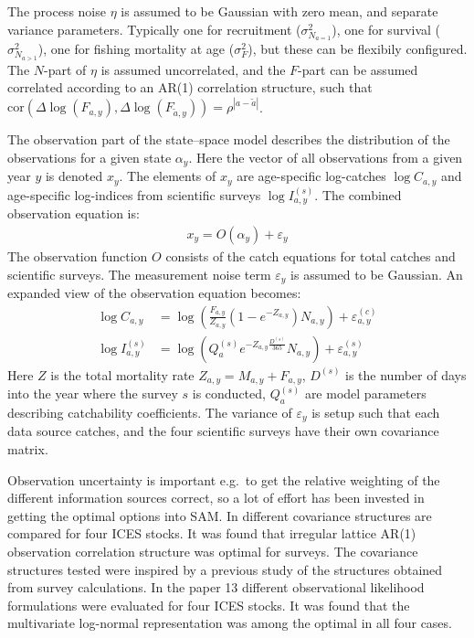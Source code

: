 \documentclass[12pt,letterpaper, leqno]{article}
\begin{document}
The process noise $\eta$ is assumed to be Gaussian with zero mean, and separate variance parameters. Typically one for recruitment ($\sigma^2_{N_{a=1}}$), one for survival ($\sigma^2_{N_{a>1}}$), one for fishing mortality at age ($\sigma^2_{F}$), but these can be flexibily configured. The $N$-part of $\eta$ is assumed uncorrelated, and the $F$-part can be assumed correlated according to an AR(1) correlation structure, such that $\mbox{cor}(\Delta\log(F_{a,y}),\Delta\log(F_{\tilde{a},y}))=\rho^{|a-\tilde{a}|}$. 

The observation part of the state--space model describes the distribution of the observations for a given state $\alpha_y$. Here the vector of all observations from a given year $y$ is denoted $x_y$. The elements of $x_y$ are age-specific log-catches $\log C_{a,y}$ and age-specific log-indices from scientific surveys $\log I^{(s)}_{a,y}$.  The combined observation equation is:
 \begin{align*}
 x_y=O(\alpha_y)+\varepsilon_y
 \end{align*}
 The observation function $O$ consists of the catch equations for total catches and scientific surveys. The measurement noise term $\varepsilon_y$ is assumed to be Gaussian. An expanded view of the observation equation becomes:
 \begin{align*}
 \log C_{a,y} &= 
\log\left(\frac{F_{a,y}}{Z_{a,y}}(1-e^{-Z_{a,y}})N_{a,y}\right)+\varepsilon^{(c)}_{a,y}\\
 \log I^{(s)}_{a,y} &= 
 \log\left(Q^{(s)}_a e^{-Z_{a,y}\frac{D^{(s)}}{365}}N_{a,y}\right)+\varepsilon^{(s)}_{a,y}
\end{align*}   
Here $Z$ is the total mortality rate $Z_{a,y}=M_{a,y}+F_{a,y}$, $D^{(s)}$ is the number of days into the year where the survey $s$ is conducted, $Q^{(s)}_a$ are model parameters describing catchability coefficients. The variance of $\varepsilon_y$ is setup such that each data source catches, and the four scientific surveys have their own covariance matrix. 

Observation uncertainty is important e.g.~to get the relative weighting of the different information sources correct, so a lot of effort has been invested in getting the optimal options into SAM. In \citet{berg2016accounting} different covariance structures are compared for four ICES stocks. It was found that irregular lattice AR(1) observation correlation structure was optimal for surveys. The covariance structures tested were inspired by a previous study \citep{berg2014evaluation} of the structures obtained from survey calculations. In the paper \citet{albertsen2016choosing} 13 different observational likelihood formulations were evaluated for four ICES stocks. It was found that the multivariate log-normal representation was among the optimal in all four cases.
\end{document}
